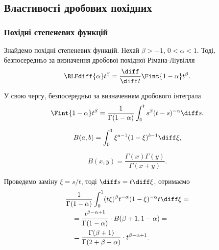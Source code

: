 \subsection{Властивості дробових похідних}

\subsubsection{Похідні степеневих функцій}

Знайдемо похідні степеневих функцій. Нехай $\beta > -1$, $0 < \alpha < 1$. Тоді, безпосередньо за визначення дробової похідної Рімана-Ліувілля
\begin{equation}
    \RLFdiff{\alpha} t^\beta = \frac{\diff}{\diff t} \Fint{1-\alpha} t^\beta.
\end{equation}

У свою чергу, безпосередньо за визначенням дробового інтеграла
\begin{equation}
    \Fint{1-\alpha} t^\beta = \frac{1}{\Gamma(1 - \alpha)} \int_0^t s^\beta (t- s)^{-\alpha} \diff s.
\end{equation}

\begin{reminder}
    \nothing
    \begin{definition}
        \begin{equation}
            B(a, b) = \int_0^1 \xi^{a-1}(1-\xi)^{b-1} \diff \xi,
        \end{equation}
    \end{definition}
    
    \begin{property}
        \begin{equation}
            B(x, y) = \frac {\Gamma (x) \Gamma (y)}{\Gamma (x + y)}.
        \end{equation}
    \end{property}
\end{reminder}

Проведемо заміну $\xi = s / t$, тоді $\diff s = t \diff \xi$, отримаємо
\begin{equation}
    \begin{aligned}
        & \frac{1}{\Gamma(1-\alpha)} \int_0^1 (t \xi)^\beta t^{-\alpha} (1 - \xi)^{-\alpha} t \diff \xi = \\
        &\quad = \frac{t^{\beta - \alpha + 1}}{\Gamma(1 - \alpha)} \cdot B(\beta + 1, 1 - \alpha) = \\
        &\quad = \frac{\Gamma(\beta + 1)}{\Gamma(2 + \beta - \alpha)} \cdot t^{\beta - \alpha + 1}.
    \end{aligned}
\end{equation}

